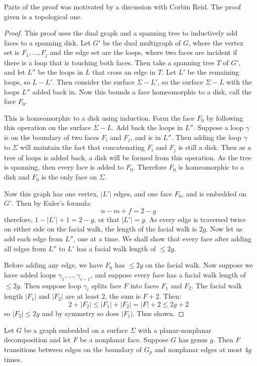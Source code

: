 Parts of the proof was motivated by a discussion with Corbin Reid. The proof given is a topological one.

\begin{proof}
	This proof uses the dual graph and a spanning tree to inductively add faces to a spanning disk. 
	Let \(G'\) be the dual multigraph of $G$, where the vertex set is \(F_1, \ldots, F_j\) and the edge set are the loops, where two faces are incident if there is a loop that is touching both faces. Then take a spanning tree \(T\) of \(G'\), and let \(L''\) be the loops in $L$ that cross an edge in \(T\). Let $L'$ be the remaining loops, so $L - L'$. 
	Then consider the surface \(\Sigma - L'\), so the surface $\Sigma - L$ with the loops $L''$ added back in. Now this bounds a face homeomorphic to a disk, call the face \(F_0\). 

	This is homeomorphic to a disk using induction. Form the face $F_0$ by following this operation on the surface $\Sigma - L$. Add back the loops in $L''$. Suppose a loop $\gamma$ is on the boundary of two faces $F_i$ and $F_j$, and is in $L''$. Then adding the loop $\gamma$ to $\Sigma$ will maintain the fact that concatenating $F_i$ and $F_j$ is still a disk. Then as a tree of loops is added back, a disk will be formed from this operation. As the tree is spanning, then every face is added to $F_0$. Therefore $F_0$ is homeomorphic to a disk and $F_0$ is the only face on $\Sigma$. 

	Now this graph has one vertex, \(|L'|\) edges, and one face \(F_0\), and is embedded on $G'$. Then by Euler's formula:
	\begin{equation}
		n - m + f = 2 - g
	\end{equation}
	therefore, \(1 - |L'| + 1 = 2 - g\), or that \(|L'| = g\). As every edge is traversed twice on either side on the facial walk, the length of the facial walk is \(2g\).
	Now let us add each edge from \(L''\), one at a time. We shall show that every face after adding all edges from \(L''\) to \(L'\) has a facial walk length of \(\leq 2g\).

	Before adding any edge, we have \(F_0\) has \(\leq 2g\) on the facial walk. Now suppose we have added loops \(\gamma_1, \ldots, \gamma_{i - 1}\), and suppose every face has a facial walk length of \(\leq 2g\).
	Then suppose loop \(\gamma_i\) splits face \(F\) into faces \(F_1\) and \(F_2\). The facial walk length \(|F_1|\) and \(|F_2|\) are at least 2, the sum is \(F + 2\). Then:
	\begin{equation}
		2 + |F_2| \leq |F_1| + |F_2| = |F| + 2 \leq 2g + 2
	\end{equation}
	so \(|F_2| \leq 2g\) and by symmetry so does \(|F_1|\). Thus shown.
\end{proof}
\begin{corollary}\label{corr:orientable_nonplanar_faces}
	Let \(G\) be a graph embedded on a surface \(\Sigma\) with a planar-nonplanar decomposition and let \(F\) be a nonplanar face. Suppose \(G\) has genus \(g\). Then \(F\) transitions between edges on the boundary of $G_p$ and nonplanar edges at most $4g$ times.
\end{corollary}

